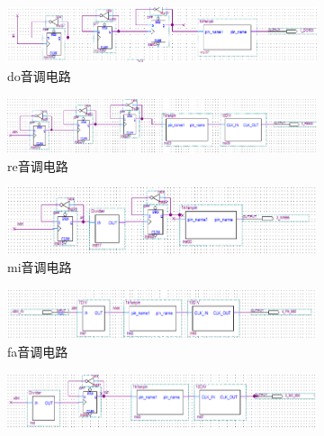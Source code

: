 \documentclass[twoside, openright]{article}
\begin{document}
\begin{figure}[htbp]
	\centering
	\begin{subfigure}[htbp]{.45\linewidth}
		\centering
		\includegraphics[width = \linewidth]{do.png}
		\caption{do音调电路}
		\label{fig:do音调电路}
	\end{subfigure}
	\quad
	\begin{subfigure}[htbp]{.45\linewidth}
		\centering
		\includegraphics[width = \linewidth]{re.png}
		\caption{re音调电路}
		\label{fig:re音调电路}
	\end{subfigure}
	\quad
	\begin{subfigure}[htbp]{.45\linewidth}
		\centering
		\includegraphics[width = \linewidth]{mi.png}
		\caption{mi音调电路}
		\label{fig:mi音调电路}
	\end{subfigure}
	\quad
	\begin{subfigure}[htbp]{.45\linewidth}
		\centering
		\includegraphics[width = \linewidth]{fa.png}
		\caption{fa音调电路}
		\label{fig:fa音调电路}
	\end{subfigure}
	\quad
	\begin{subfigure}[htbp]{.45\linewidth}
		\centering
		\includegraphics[width = \linewidth]{so.png}

\end{subfigure}
\end{figure}
\end{document}
